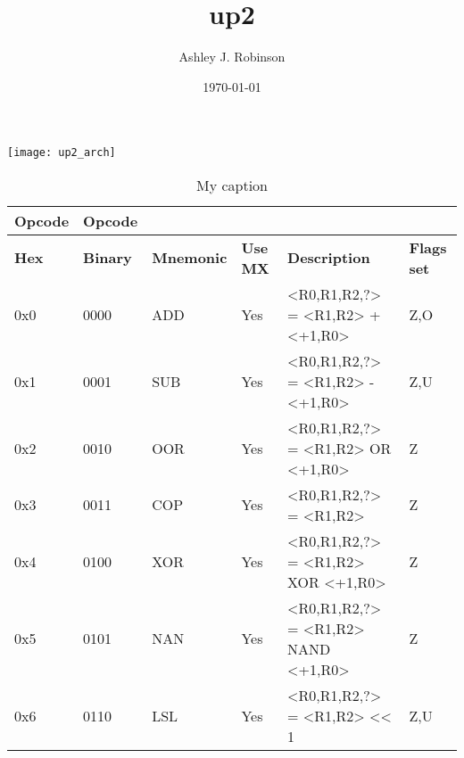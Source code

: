 \documentclass[a4paper]{article}
\title{up2}
\author{Ashley J. Robinson}
\date{\today}
\begin{document}
\maketitle

\section{}

\texttt{[image: up2\_arch]}

\begin{table}[]
    \centering
    \caption{My caption}
    \label{my-label}
    \begin{tabular}{|l|l|l|l|l|l|}
        \hline
        \textbf{Opcode}     &   \textbf{Opcode} &                       &                       &                                           &                           \\ \hline  
        \textbf{Hex}        &   \textbf{Binary} &   \textbf{Mnemonic}   &   \textbf{Use MX}     &   \textbf{Description}                    &   \textbf{Flags set}      \\ \hline  
        0x0                 &   0000            &   ADD                 &   Yes                 &   <R0,R1,R2,?> = <R1,R2> + <+1,R0>        &   Z,O                     \\ \hline  
        0x1                 &   0001            &   SUB                 &   Yes                 &   <R0,R1,R2,?> = <R1,R2> - <+1,R0>        &   Z,U                     \\ \hline  
        0x2                 &   0010            &   OOR                 &   Yes                 &   <R0,R1,R2,?> = <R1,R2> OR <+1,R0>       &   Z                       \\ \hline  
        0x3                 &   0011            &   COP                 &   Yes                 &   <R0,R1,R2,?> = <R1,R2>                  &   Z                       \\ \hline  
        0x4                 &   0100            &   XOR                 &   Yes                 &   <R0,R1,R2,?> = <R1,R2> XOR <+1,R0>      &   Z                       \\ \hline  
        0x5                 &   0101            &   NAN                 &   Yes                 &   <R0,R1,R2,?> = <R1,R2> NAND <+1,R0>     &   Z                       \\ \hline 
        0x6                 &   0110            &   LSL                 &   Yes                 &   <R0,R1,R2,?> = <R1,R2> << 1             &   Z,U                     \\ \hline 

\end{tabular}
\end{table}
\end{document}
